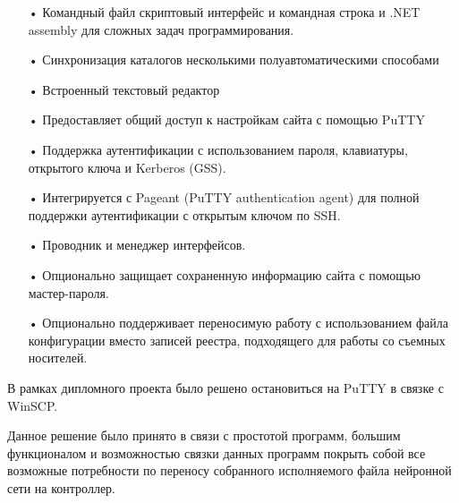 {\begin{itemize}[leftmargin=2.15cm, labelwidth=0.65cm, labelsep=0.0cm]
		\addtocounter{itemcntr}{1}
		
		\item[•]  Командный файл скриптовый интерфейс и командная строка и .NET assembly для сложных задач программирования.
		
		\addtocounter{itemcntr}{1}
		
		\item[•] Синхронизация каталогов несколькими полуавтоматическими способами 
		
		\addtocounter{itemcntr}{1}
		
		\item[•] Встроенный текстовый редактор
	
		\addtocounter{itemcntr}{1}
		
		\item[•] Предоставляет общий доступ к настройкам сайта с помощью PuTTY 
		
		\addtocounter{itemcntr}{1}
		
		\item[•] Поддержка аутентификации с использованием пароля, клавиатуры, открытого ключа и Kerberos (GSS). 
		
		\addtocounter{itemcntr}{1}
		
		\item[•] Интегрируется с Pageant (PuTTY authentication agent) для полной поддержки аутентификации с открытым ключом по SSH.
		
		\addtocounter{itemcntr}{1}
		
		\item[•] Проводник и менеджер интерфейсов. 
		
		\addtocounter{itemcntr}{1}
		
		\item[•] Опционально защищает сохраненную информацию сайта с помощью мастер-пароля.
		
		\addtocounter{itemcntr}{1}
		
		\item[•] Опционально поддерживает переносимую работу с использованием файла конфигурации вместо записей реестра, подходящего для работы со съемных носителей.
		
		\addtocounter{itemcntr}{1}
		
		\setcounter{itemcntr}{1}
	\end{itemize} 	
	
	\par \redline В рамках дипломного проекта было решено остановиться на PuTTY в связке с WinSCP. 

    \par \redline Данное решение было принято в связи с простотой программ, большим функционалом и возможностью связки данных программ покрыть собой все возможные потребности по переносу собранного исполняемого файла нейронной сети на контроллер.
	
	\par
}

